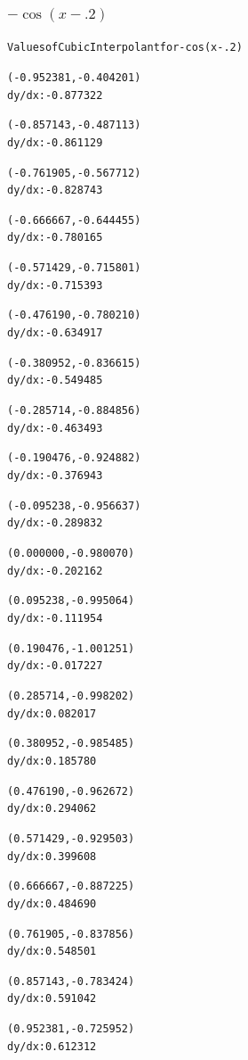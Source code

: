 \documentclass[11pt]{article} %
\begin{document}
\subsubsection*{$-\cos(x-.2)$}
\begin{alltt}
 Values of Cubic Interpolant for -cos(x-.2)

(-0.952381, -0.404201)
 dy/dx:	-0.877322

(-0.857143, -0.487113)
 dy/dx:	-0.861129

(-0.761905, -0.567712)
 dy/dx:	-0.828743

(-0.666667, -0.644455)
 dy/dx:	-0.780165

(-0.571429, -0.715801)
 dy/dx:	-0.715393

(-0.476190, -0.780210)
 dy/dx:	-0.634917

(-0.380952, -0.836615)
 dy/dx:	-0.549485

(-0.285714, -0.884856)
 dy/dx:	-0.463493

(-0.190476, -0.924882)
 dy/dx:	-0.376943

(-0.095238, -0.956637)
 dy/dx:	-0.289832

(0.000000, -0.980070)
 dy/dx:	-0.202162

(0.095238, -0.995064)
 dy/dx:	-0.111954

(0.190476, -1.001251)
 dy/dx:	-0.017227

(0.285714, -0.998202)
 dy/dx:	0.082017

(0.380952, -0.985485)
 dy/dx:	0.185780

(0.476190, -0.962672)
 dy/dx:	0.294062

(0.571429, -0.929503)
 dy/dx:	0.399608

(0.666667, -0.887225)
 dy/dx:	0.484690

(0.761905, -0.837856)
 dy/dx:	0.548501

(0.857143, -0.783424)
 dy/dx:	0.591042

(0.952381, -0.725952)
 dy/dx:	0.612312
\end{alltt}
\end{document}
